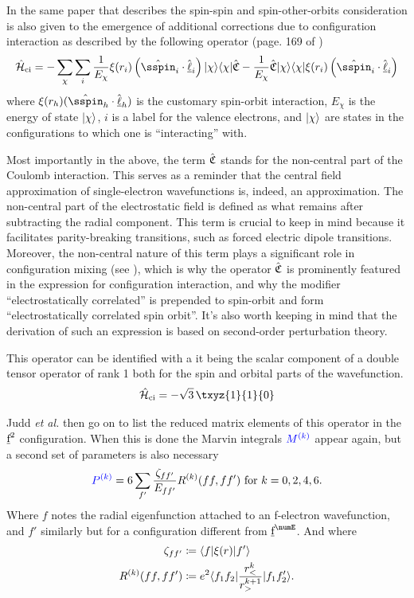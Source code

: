 \documentclass{article}
\begin{document}
In the same paper \cite{judd_intra-atomic_1968} that describes the spin-spin and spin-other-orbits consideration is also given to the emergence of additional corrections due to configuration interaction as described by the following operator (page.  169 of \cite{judd_intra-atomic_1968})
\begin{equation}
\ham_{\text{ci}} = -\sum_\chi \sum_i \frac{1}{E_\chi}\xi(r_i) 
    \left(  
        \op{\sspin}_i\cdot\op{\lorb}_i
    \right) \ket{\chi} \bra{\chi} \CoulombNonCentral
    - \frac{1}{E_\chi}\CoulombNonCentral \ket{\chi}\bra{\chi} \xi(r_i) 
        \left( 
            \op{\sspin}_i\cdot\op{\lorb}_i
        \right) 
\end{equation} 
where $\xi(r_h) (\op{\sspin}_h\cdot\op{\lorb}_h)$ is the customary spin-orbit interaction, $E_\chi$ is the energy of state $|\chi\rangle$, $i$ is a label for the valence electrons, and $|\chi\rangle$ are states in the configurations to which one is ``interacting'' with.

Most importantly in the above, the term $\hat{\mathfrak{C}}$ stands for the non-central part of the Coulomb interaction. This serves as a reminder that the central field approximation of single-electron wavefunctions is, indeed, an approximation. The non-central part of the electrostatic field is defined as what remains after subtracting the radial component. This term is crucial to keep in mind because it facilitates parity-breaking transitions, such as forced electric dipole transitions. Moreover, the non-central nature of this term plays a significant role in configuration mixing (see \cite{morrison_many-body_1971}), which is why the operator $\hat{\mathfrak{C}}$ is prominently featured in the expression for configuration interaction, and why the modifier ``electrostatically correlated'' is prepended to spin-orbit and form ``electrostatically correlated spin orbit''. It's also worth keeping in mind that the derivation of such an expression is based on second-order perturbation theory.

This operator can be identified with a it being the scalar component of a double tensor operator of rank 1 both for the spin and orbital parts of the wavefunction. 
\begin{equation}
\ham_{\text{ci}} = - \sqrt{3}\,\txyz{1}{1}{0}
\end{equation}

Judd \textit{et al.} then go on to list the reduced matrix elements of this operator in the $\underbar{$\text{f}$}^2$ configuration. When this is done the Marvin integrals $\textcolor{blue}{M^{(k)}}$ appear again, but a second set of parameters is also necessary
\begin{equation}
\textcolor{blue}{P^{(k)}} = 6 \sum_{f'}
    \frac{\zeta_{ff'}}
        {E_{ff'}}
        R^{(k)}(ff,ff') \text{ for }k=0,2,4,6.
\end{equation}
Where $f$ notes the radial eigenfunction attached to an f-electron wavefunction, and $f'$ similarly but for a configuration different from $\forb^\numE$. And where
\begin{align}
    \zeta_{ff'} &\coloneqq \langle f|\xi(r)|f'\rangle \\
    R^{(k)}(ff,ff') &\coloneqq e^2 \langle f_1f_2|\frac{r_<^k}{r_>^{k+1}}|f_1f_2'\rangle.
\end{align}
\end{document}
